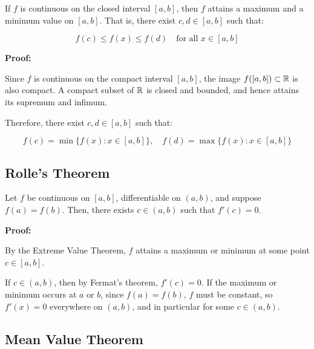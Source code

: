 If \(f\) is continuous on the closed interval \([a, b] \), then \(f\) attains a maximum and a 
minimum value on \([a, b]\). That is, there exist \( c, d \in [a, b] \) such that:

\[
    f(c) \le f(x) \le f(d) \quad \text{for all } x \in [a, b]
\]

\textbf{Proof:}  

Since \(f\) is continuous on the compact interval \([a, b]\), the image \( f([a, b]) \subset \mathbb{R} \) 
is also compact. A compact subset of \( \mathbb{R} \) is closed and bounded, and hence 
attains its supremum and infimum.

Therefore, there exist \( c, d \in [a, b] \) such that:

\[
    f(c) = \min\{f(x): x \in [a, b]\}, \quad
    f(d) = \max\{f(x): x \in [a, b]\}
\]

\QED

\subsection{Rolle’s Theorem}
Let \(f\) be continuous on \([a, b] \), differentiable on \((a, b) \), and suppose \( f(a) = f(b) \).  
Then, there exists \( c \in (a, b) \) such that \( f'(c) = 0 \).
\vspace{\baselineskip}

\textbf{Proof:}  

By the Extreme Value Theorem, \(f\) attains a maximum or minimum at some point \( c \in [a, b] \).

If \( c \in (a, b) \), then by Fermat’s theorem, \( f'(c) = 0 \).  
If the maximum or minimum occurs at \(a\) or \(b\), since \( f(a) = f(b) \), \(f\) must be 
constant, so \( f'(x) = 0 \) everywhere on \((a, b)\), and in particular for some \( c \in (a, b) \).

\QED

\begin{center}
\end{center}



\subsection{Mean Value Theorem}


